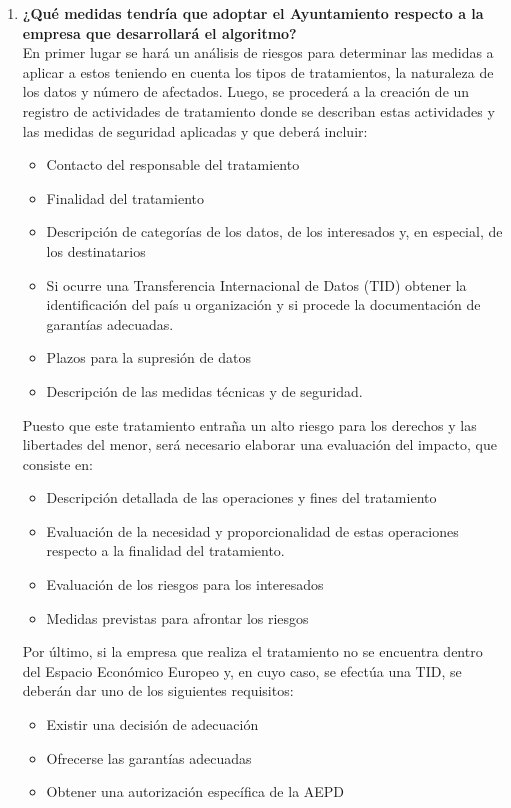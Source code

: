 \documentclass[10pt,a4paper]{article}
\begin{document}
\begin{enumerate}
\item \textbf{¿Qué medidas tendría que adoptar el Ayuntamiento respecto a la empresa que desarrollará el algoritmo?}\\
En primer lugar se hará un análisis de riesgos para determinar las medidas a aplicar a estos teniendo en cuenta los tipos de tratamientos, la naturaleza de los datos y número de afectados. Luego, se procederá a la creación de un registro de actividades de tratamiento donde se describan estas actividades y las medidas de seguridad aplicadas y que deberá incluir:
\begin{itemize}
\item Contacto del responsable del tratamiento
\item Finalidad del tratamiento
\item Descripción de categorías de los datos, de los interesados y, en especial, de los destinatarios
\item Si ocurre una Transferencia Internacional de Datos (TID) obtener la identificación del país u organización y si procede la documentación de garantías adecuadas.
\item Plazos para la supresión de datos
\item Descripción de las medidas técnicas y de seguridad.
\end{itemize}
Puesto que este tratamiento entraña un alto riesgo para los derechos y las libertades del menor, será necesario elaborar una evaluación del impacto, que consiste en:
\begin{itemize}
\item Descripción detallada de las operaciones y fines del tratamiento
\item Evaluación de la necesidad y proporcionalidad de estas operaciones respecto a la finalidad del tratamiento.
\item Evaluación de los riesgos para los interesados
\item Medidas previstas para afrontar los riesgos
\end{itemize}
Por último, si la empresa que realiza el tratamiento no se encuentra dentro del Espacio Económico Europeo y, en cuyo caso, se efectúa una TID, se deberán dar uno de los siguientes requisitos:
\begin{itemize}
\item Existir una decisión de adecuación
\item Ofrecerse las garantías adecuadas
\item Obtener una autorización específica de la AEPD
\end{itemize}


\end{enumerate}
\end{document}
